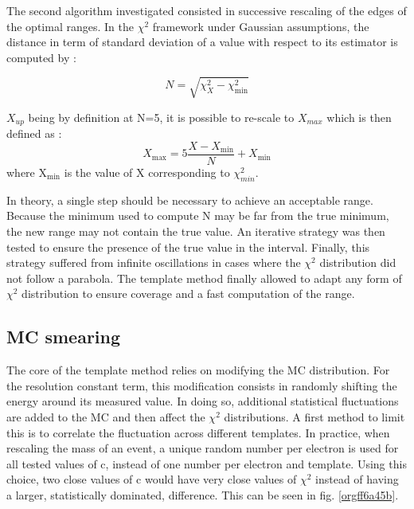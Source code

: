 The second algorithm investigated consisted in successive rescaling of the edges of the optimal ranges.
In the $\chi^2$ framework under Gaussian assumptions, the distance in term of standard deviation of a value with respect to its estimator is computed by :

\begin{equation}
N = \sqrt{\chi^2_{X}-\chi^2_\text{min}}
\end{equation}

$X_{up}$ being by definition at N=5, it is possible to re-scale to $X_{max}$ which is then defined as :
\begin{equation}
X_\text{max} = 5\frac{X-X_\text{min}}{N} + X_\text{min}
\end{equation}
where X\(_{\text{min}}\) is the value of X corresponding to $\chi^2_{min}$.

In theory, a single step should be necessary to achieve an acceptable range.
Because the minimum used to compute N may be far from the true minimum, the new range may not contain the true value.
An iterative strategy was then tested to ensure the presence of the true value in the interval.
Finally, this strategy suffered from infinite oscillations in cases where the $\chi^2$ distribution did not follow a parabola.
The template method finally allowed to adapt any form of $\chi^2$ distribution to ensure coverage and a fast computation of the range.


\subsection{MC smearing}
\label{sec:org5d87ec9}
\label{sec:Calibration_inSitu_nUseEl}

The core of the template method relies on modifying the MC distribution.
For the resolution constant term, this modification consists in randomly shifting the energy around its measured value.
In doing so, additional statistical fluctuations are added to the MC and then affect the $\chi^2$ distributions.
A first method to limit this is to correlate the fluctuation across different templates.
In practice, when rescaling the mass of an event, a unique random number per electron is used for all tested values of c, instead of one number per electron and template.
Using this choice, two close values of c would have very close values of $\chi^2$ instead of having a larger, statistically dominated, difference.
This can be seen in fig. \ref{orgff6a45b}.


